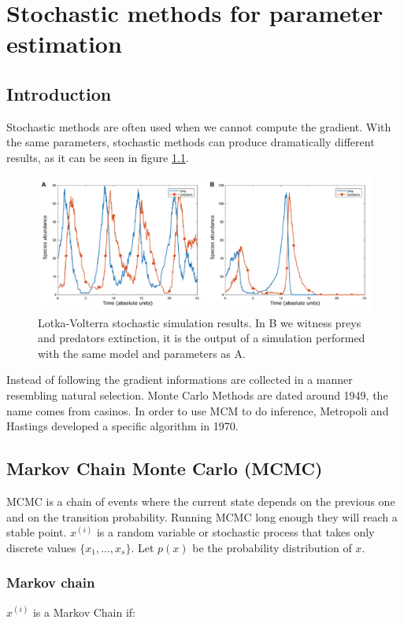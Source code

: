 \graphicspath{{chapters/11/images}}
\chapter{Stochastic methods for parameter estimation}

\section{Introduction}
Stochastic methods are often used when we cannot compute the gradient.
With the same parameters, stochastic methods can produce dramatically different results, as it can be seen in figure \ref{fig:res}.

\begin{figure}[H]
  \centering
  \includegraphics[width=\textwidth]{stoch_LV.png}
  \caption{Lotka-Volterra stochastic simulation results. In B we witness
  preys and predators extinction, it is the output of a simulation
  performed with the same model and parameters as A.}
\label{fig:res}
\end{figure}

Instead of following the gradient informations are collected in a manner resembling natural selection.
Monte Carlo Methods are dated around 1949, the name comes from casinos.
In order to use MCM to do inference, Metropoli and Hastings developed a specific algorithm in 1970.

\section{Markov Chain Monte Carlo (MCMC)}
MCMC is a chain of events where the current state depends on the previous one and on the transition probability.
Running MCMC long enough they will reach a stable point.
$x^{(i)}$ is a random variable or stochastic process that takes only discrete values $\{x_1,\dots,x_s\}$.
Let $p(x)$ be the probability distribution of $x$.

  \subsection{Markov chain}
  $x^{(i)}$ is a Markov Chain if:

